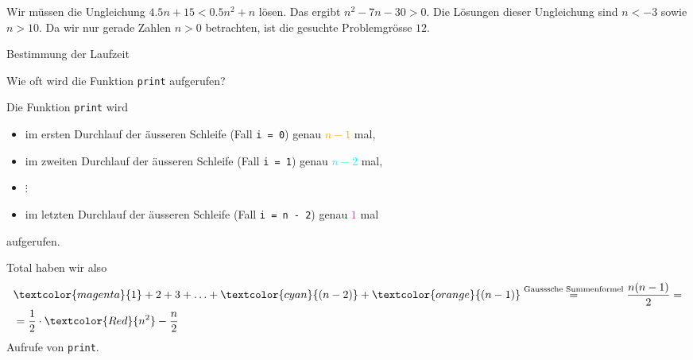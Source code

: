 \begin{frame}
\begin{myanswer}
Wir müssen die Ungleichung \(4.5n + 15 < 0.5n^2 + n\) lösen. Das ergibt \(n^2 - 7n - 30 > 0\). Die Lösungen dieser Ungleichung sind \(n < -3\) sowie \(n > 10\). Da wir nur gerade Zahlen \(n > 0\) betrachten, ist die gesuchte Problemgrösse \(12\).
\end{myanswer}
\end{frame}

\begin{frame}{Bestimmung der Laufzeit \faStar\faStar\faStar[regular]\faStar[regular]\faStar[regular]}
	\begin{myexercise}
    
 
    Wie oft wird die Funktion \lstinline{print} aufgerufen?
	\end{myexercise}
\end{frame}

\begin{frame}[fragile]
\begin{myanswer}
{\scriptsize
    Die Funktion \lstinline{print} wird
    \begin{itemize}[<+->]
        \item im ersten Durchlauf der äusseren Schleife (Fall \lstinline{i = 0}) genau \textcolor{orange}{$n-1$} mal,
        \item im zweiten Durchlauf der äusseren Schleife (Fall \lstinline{i = 1}) genau \textcolor{cyan}{$n-2$} mal,
        \item $\vdots$
        \item im letzten Durchlauf der äusseren Schleife (Fall \lstinline{i = n - 2}) genau \textcolor{magenta}{$1$} mal
    \end{itemize}
    \pause
    aufgerufen.

    \pause
    Total haben wir also
    \begin{align*}
		&\textcolor{magenta}{1} + 2 + 3 + \ldots + \textcolor{cyan}{(n-2)} + \textcolor{orange}{(n-1)} \stackrel{\text{Gausssche Summenformel}}{=} \frac{n(n-1)}{2} =\\
		&= \frac{1}{2}\cdot\textcolor{Red}{n^2} - \frac{n}{2}
	\end{align*}
	\pause
    Aufrufe von \lstinline{print}.
}%
\end{myanswer}
\end{frame}

